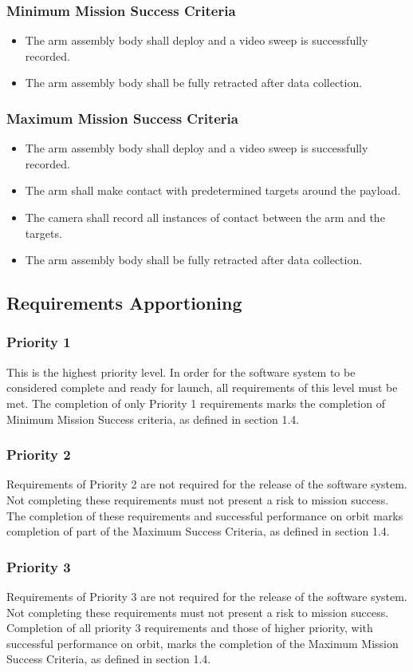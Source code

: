 \documentclass[letterpaper,10pt]{article}
\begin{document}
\subsubsection{Minimum Mission Success Criteria}
\begin{itemize}
\item{The arm assembly body shall deploy and a video sweep is successfully recorded.}
\item{The arm assembly body shall be fully retracted after data collection.}
\end{itemize}
\subsubsection{Maximum Mission Success Criteria}
\begin{itemize}
\item{The arm assembly body shall deploy and a video sweep is successfully recorded.}
\item{The arm shall make contact with predetermined targets around the payload.}
\item{The camera shall record all instances of contact between the arm and the targets.}
\item{The arm assembly body shall be fully retracted after data collection.}
\end{itemize}
\subsection{Requirements Apportioning}
\subsubsection{Priority 1}
This is the highest priority level. In order for the software system to be considered complete and ready for launch, all requirements of this level must be met.
The completion of only Priority 1 requirements marks the completion of Minimum Mission Success criteria, as defined in section 1.4.
\subsubsection{Priority 2}
Requirements of Priority 2 are not required for the release of the software system.
Not completing these requirements must not present a risk to mission success.
The completion of these requirements and successful performance on orbit marks completion of part of the Maximum Success Criteria, as defined in section 1.4.
\subsubsection{Priority 3}
Requirements of Priority 3 are not required for the release of the software system.
Not completing these requirements must not present a risk to mission success.
Completion of all priority 3 requirements and those of higher priority, with successful performance on orbit, marks the completion of the Maximum Mission Success Criteria, as defined in section 1.4.
\end{document}

